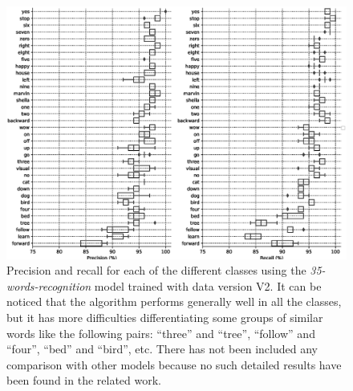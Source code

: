 \documentclass[review]{elsarticle}
\begin{document}
\begin{figure}[h]
	\centering
	\includegraphics[width=1.0\linewidth]{img/boxplot_35-words-recognition_002.eps}
	\caption{Precision and recall for each of the different classes using the \textit{35-words-recognition} model trained with data version V2. It can be noticed that the algorithm performs generally well in all the classes, but it has more difficulties differentiating some groups of similar words like the following pairs: ``three'' and ``tree'', ``follow'' and ``four'', ``bed'' and ``bird'', etc. There has not been included any comparison with other models because no such detailed results have been found in the related work.}
	\label{fig:boxplot35002}
\end{figure}
\end{document}
